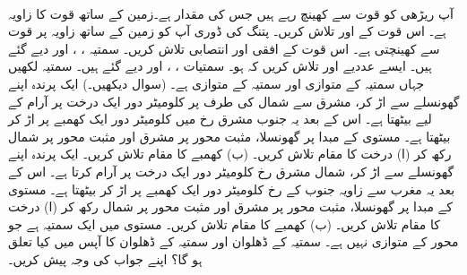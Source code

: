 \\
آپ  ریڑھی کو قوت  سے کھینچ رہے ہیں جس کی مقدار  ہے۔زمین کے ساتھ قوت کا زاویہ  ہے۔ اس قوت کے  اور   تلاش کریں۔
پتنگ کی ڈوری آپ کو زمین کے ساتھ  زاویہ پر  قوت سے کھینچتی ہے۔ اس قوت کے افقی اور انتصابی  تلاش کریں۔
سمتیہ ، ،  اور  دیے گئے ہیں۔ ایسے عددیے   اور   تلاش کریں کہ  ہو۔
سمتیات ،  ، اور  دیے گئے ہیں۔ سمتیہ  لکھیں جہاں  سمتیہ  کے متوازی اور  سمتیہ  کے متوازی ہے۔ (سوال  دیکھیں۔)
 ایک پرندہ اپنے گھونسلے سے اڑ کر، مشرق سے شمال کی طرف  پر   کلومیٹر دور ایک درخت پر  آرام کے لیے بیٹھتا ہے۔ اس کے بعد یہ جنوب مشرق رخ میں   کلومیٹر دور ایک کھمبے پر اڑ کر  بیٹھتا ہے۔ مستوی  کے مبدا پر گھونسلا، مثبت محور  پر مشرق اور مثبت محور  پر شمال  رکھ کر  (ا) درخت کا مقام تلاش کریں۔ (ب) کھمبے کا مقام تلاش کریں۔
 ایک پرندہ اپنے گھونسلے سے اڑ کر، شمال مشرق رخ  کلومیٹر دور ایک درخت پر آرام کرتا ہے۔ اس کے بعد یہ مغرب سے   زاویہ جنوب کے رخ  کلومیٹر دور ایک  کھمبے پر اڑ کر بیٹھتا ہے۔ مستوی  کے مبدا پر گھونسلا، مثبت محور  پر مشرق اور مثبت محور  پر شمال  رکھ کر  (ا) درخت کا مقام تلاش کریں۔ (ب) کھمبے کا مقام تلاش کریں۔
مستوی میں  ایک سمتیہ ہے جو محور  کے متوازی نہیں ہے۔ سمتیہ  کے ڈھلوان اور سمتیہ  کے ڈھلوان کا آپس میں کیا تعلق ہو گا؟ اپنے جواب کی وجہ پیش کریں۔

